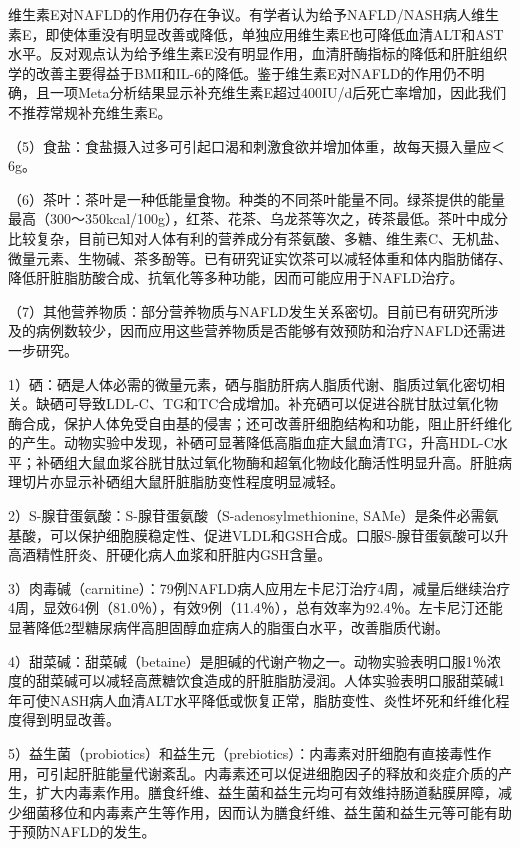 维生素E对NAFLD的作用仍存在争议。有学者认为给予NAFLD/NASH病人维生素E，即使体重没有明显改善或降低，单独应用维生素E也可降低血清ALT和AST水平。反对观点认为给予维生素E没有明显作用，血清肝酶指标的降低和肝脏组织学的改善主要得益于BMI和IL-6的降低。鉴于维生素E对NAFLD的作用仍不明确，且一项Meta分析结果显示补充维生素E超过400IU/d后死亡率增加，因此我们不推荐常规补充维生素E。

（5）食盐：食盐摄入过多可引起口渴和刺激食欲并增加体重，故每天摄入量应＜6g。

（6）茶叶：茶叶是一种低能量食物。种类的不同茶叶能量不同。绿茶提供的能量最高（300～350kcal/100g），红茶、花茶、乌龙茶等次之，砖茶最低。茶叶中成分比较复杂，目前已知对人体有利的营养成分有茶氨酸、多糖、维生素C、无机盐、微量元素、生物碱、茶多酚等。已有研究证实饮茶可以减轻体重和体内脂肪储存、降低肝脏脂肪酸合成、抗氧化等多种功能，因而可能应用于NAFLD治疗。

（7）其他营养物质：部分营养物质与NAFLD发生关系密切。目前已有研究所涉及的病例数较少，因而应用这些营养物质是否能够有效预防和治疗NAFLD还需进一步研究。

1）硒：硒是人体必需的微量元素，硒与脂肪肝病人脂质代谢、脂质过氧化密切相关。缺硒可导致LDL-C、TG和TC合成增加。补充硒可以促进谷胱甘肽过氧化物酶合成，保护人体免受自由基的侵害；还可改善肝细胞结构和功能，阻止肝纤维化的产生。动物实验中发现，补硒可显著降低高脂血症大鼠血清TG，升高HDL-C水平；补硒组大鼠血浆谷胱甘肽过氧化物酶和超氧化物歧化酶活性明显升高。肝脏病理切片亦显示补硒组大鼠肝脏脂肪变性程度明显减轻。

2）S-腺苷蛋氨酸：S-腺苷蛋氨酸（S-adenosylmethionine,
SAMe）是条件必需氨基酸，可以保护细胞膜稳定性、促进VLDL和GSH合成。口服S-腺苷蛋氨酸可以升高酒精性肝炎、肝硬化病人血浆和肝脏内GSH含量。

3）肉毒碱（carnitine）：79例NAFLD病人应用左卡尼汀治疗4周，减量后继续治疗4周，显效64例（81.0％），有效9例（11.4％），总有效率为92.4％。左卡尼汀还能显著降低2型糖尿病伴高胆固醇血症病人的脂蛋白水平，改善脂质代谢。

4）甜菜碱：甜菜碱（betaine）是胆碱的代谢产物之一。动物实验表明口服1％浓度的甜菜碱可以减轻高蔗糖饮食造成的肝脏脂肪浸润。人体实验表明口服甜菜碱1年可使NASH病人血清ALT水平降低或恢复正常，脂肪变性、炎性坏死和纤维化程度得到明显改善。

5）益生菌（probiotics）和益生元（prebiotics）：内毒素对肝细胞有直接毒性作用，可引起肝脏能量代谢紊乱。内毒素还可以促进细胞因子的释放和炎症介质的产生，扩大内毒素作用。膳食纤维、益生菌和益生元均可有效维持肠道黏膜屏障，减少细菌移位和内毒素产生等作用，因而认为膳食纤维、益生菌和益生元等可能有助于预防NAFLD的发生。

